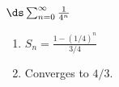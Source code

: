 {$\ds \sum_{n=0}^\infty \frac{1}{4^n}$
}
{\begin{enumerate}
\item	$S_n = \frac{1-(1/4)^n}{3/4}$
\item	Converges to $4/3$.
\end{enumerate}
}
